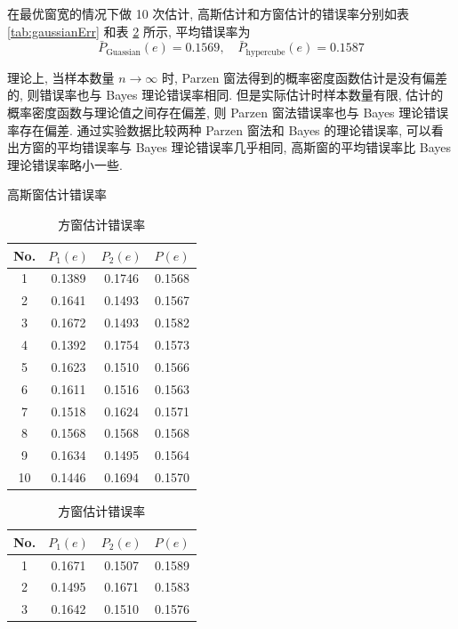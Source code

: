 \documentclass[openany]{ctexbook}
\theoremstyle{kaiti}
\theoremstyle{normal}
\begin{document}
在最优窗宽的情况下做 10 次估计, 高斯估计和方窗估计的错误率分别如表 \ref{tab:gaussianErr} 和表 \ref{tab:rectErr} 所示, 平均错误率为
\begin{equation}
  \bar{P}_{\mathrm{Guassian}}(e)=0.1569,\quad \bar{P}_{\mathrm{hypercube}}(e)=0.1587
\end{equation}

理论上, 当样本数量 $n\to\infty$ 时, Parzen 窗法得到的概率密度函数估计是没有偏差的, 则错误率也与 Bayes 理论错误率相同. 但是实际估计时样本数量有限, 估计的概率密度函数与理论值之间存在偏差, 则 Parzen 窗法错误率也与 Bayes 理论错误率存在偏差. 通过实验数据比较两种 Parzen 窗法和 Bayes 的理论错误率, 可以看出方窗的平均错误率与 Bayes 理论错误率几乎相同, 高斯窗的平均错误率比 Bayes 理论错误率略小一些.

\begin{table}[htbp]
  \centering
  \begin{minipage}{0.4\textwidth}
    \centering
    \caption{高斯窗估计错误率}
    \label{tab:gaussianErr}
    \begin{tabular}{c|ccc}
      \hline
      No. & $P_1(e)$ & $P_2(e)$ & $P(e)$ \\
      \hline
      1  & 0.1389 & 0.1746 & 0.1568 \\
      2  & 0.1641 & 0.1493 & 0.1567 \\
      3  & 0.1672 & 0.1493 & 0.1582 \\
      4  & 0.1392 & 0.1754 & 0.1573 \\
      5  & 0.1623 & 0.1510 & 0.1566 \\
      6  & 0.1611 & 0.1516 & 0.1563 \\
      7  & 0.1518 & 0.1624 & 0.1571 \\
      8  & 0.1568 & 0.1568 & 0.1568 \\
      9  & 0.1634 & 0.1495 & 0.1564 \\
      10 & 0.1446 & 0.1694 & 0.1570 \\
      \hline   
    \end{tabular}
  \end{minipage}
  \begin{minipage}{0.4\textwidth}
    \centering
    \caption{方窗估计错误率}
    \label{tab:rectErr}
    \begin{tabular}{c|ccc}
      \hline
      No. & $P_1(e)$ & $P_2(e)$ & $P(e)$ \\
      \hline
      1  & 0.1671 & 0.1507 & 0.1589 \\
      2  & 0.1495 & 0.1671 & 0.1583 \\
      3  & 0.1642 & 0.1510 & 0.1576 \\

\end{tabular}
\end{minipage}
\end{table}
\end{document}
